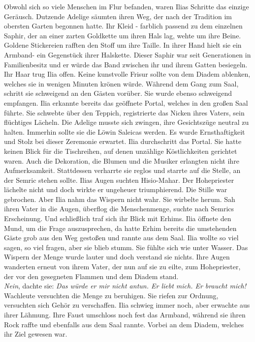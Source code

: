Obwohl sich so viele Menschen im Flur befanden, waren Ilias Schritte das einzige Geräusch. Dutzende 
Adelige säumten ihren Weg, der nach der Tradition im obersten Garten begonnen hatte. Ihr Kleid - 
farblich passend zu dem einzelnen Saphir, der an einer zarten Goldkette um ihren Hals lag, wehte um 
ihre Beine. Goldene Stickereien rafften den Stoff um ihre Taille. In ihrer Hand hielt sie ein 
Armband- ein Gegenstück ihrer Halskette. Dieser Saphir war seit Generationen in Familienbesitz 
und er würde das Band zwischen ihr und ihrem Gatten besiegeln. Ihr Haar trug Ilia offen. Keine 
kunstvolle Frisur sollte von dem Diadem ablenken, welches sie in wenigen Minuten krönen würde. 
Während dem Gang zum Saal, schritt sie schweigend an den Gästen vorüber. Sie wurde ebenso schweigend 
empfangen. Ilia erkannte bereits das geöffnete Portal, welches in den großen Saal führte. Sie 
schwebte über den Teppich, registrierte das Nicken ihres Vaters, sein flüchtiges Lächeln. 
Die Adelige musste sich zwingen, ihre Gesichtszüge neutral zu halten. Immerhin sollte sie die Löwin 
Saleicas werden. Es wurde Ernsthaftigkeit und Stolz bei dieser Zeremonie erwartet. Ilia 
durchschritt das Portal. Sie hatte keinen Blick für die Tischreihen, auf denen unzählige 
Köstlichkeiten gerichtet waren. Auch die Dekoration, die Blumen und die Musiker erlangten nicht 
ihre Aufmerksamkeit. Stattdessen verharrte sie reglos und starrte auf die Stelle, an der Semric 
stehen sollte. Ilias Augen suchten Hisio-Mahar. Der Hohepriester lächelte nicht und doch wirkte 
er ungeheuer triumphierend. Die Stille war gebrochen. Aber Ilia nahm das Wispern nicht wahr. Sie 
wirbelte herum. Sah ihren Vater in die Augen, überflog die Menschenmenge, suchte nach Semrics 
Erscheinung. Und schließlich traf sich ihr Blick mit Erhims. Ilia öffnete den Mund, um die Frage 
auszusprechen, da hatte Erhim bereits die umstehenden Gäste grob aus den Weg gestoßen und rannte 
aus dem Saal. Ilia wollte so viel sagen, so viel fragen, aber sie blieb stumm. Sie fühlte sich wie 
unter Wasser. Das Wispern der Menge wurde lauter und doch verstand sie nichts. Ihre Augen wanderten 
erneut von ihrem Vater, der nun auf sie zu eilte, zum Hohepriester, der vor den gesegneten Flammen 
und dem Diadem stand. \\
\textit{Nein}, dachte sie: \textit{Das würde er mir nicht antun. Er liebt mich. Er braucht mich!}\\
Wachleute versuchten die Menge zu beruhigen. Sie riefen zur Ordnung, versuchten sich Gehör zu 
verschaffen. Ilia schwieg immer noch, aber erwachte aus ihrer Lähmung. Ihre Faust umschloss 
noch fest das Armband, während sie ihren Rock raffte und ebenfalls aus dem Saal rannte. Vorbei an 
dem Diadem, welches ihr Ziel gewesen war.\\

